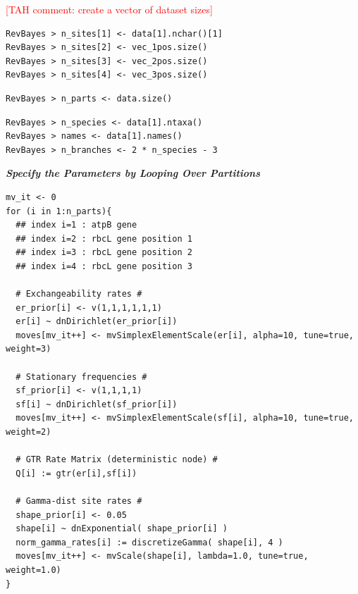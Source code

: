 \documentclass[11pt]{article}
\newcommand{\taha}[1]{{\textcolor{red}{[TAH comment: #1]}}} %
\begin{document}
\taha{create a vector of dataset sizes}
{\tt \begin{snugshade*}
\begin{lstlisting}
RevBayes > n_sites[1] <- data[1].nchar()[1]
RevBayes > n_sites[2] <- vec_1pos.size()
RevBayes > n_sites[3] <- vec_2pos.size()
RevBayes > n_sites[4] <- vec_3pos.size()
\end{lstlisting}
\end{snugshade*}}

{\tt \begin{snugshade*}
\begin{lstlisting}
RevBayes > n_parts <- data.size()
\end{lstlisting}
\end{snugshade*}}

{\tt \begin{snugshade*}
\begin{lstlisting}
RevBayes > n_species <- data[1].ntaxa()
RevBayes > names <- data[1].names()
RevBayes > n_branches <- 2 * n_species - 3
\end{lstlisting}
\end{snugshade*}}



\textbf{\textit{Specify the Parameters by Looping Over Partitions}}


{\tt \small \begin{snugshade*}
\begin{lstlisting}
mv_it <- 0
for (i in 1:n_parts){
  ## index i=1 : atpB gene
  ## index i=2 : rbcL gene position 1
  ## index i=3 : rbcL gene position 2
  ## index i=4 : rbcL gene position 3

  # Exchangeability rates #
  er_prior[i] <- v(1,1,1,1,1,1)
  er[i] ~ dnDirichlet(er_prior[i])
  moves[mv_it++] <- mvSimplexElementScale(er[i], alpha=10, tune=true, weight=3) 

  # Stationary frequencies #
  sf_prior[i] <- v(1,1,1,1)
  sf[i] ~ dnDirichlet(sf_prior[i])
  moves[mv_it++] <- mvSimplexElementScale(sf[i], alpha=10, tune=true, weight=2) 

  # GTR Rate Matrix (deterministic node) #
  Q[i] := gtr(er[i],sf[i]) 

  # Gamma-dist site rates #
  shape_prior[i] <- 0.05 
  shape[i] ~ dnExponential( shape_prior[i] )
  norm_gamma_rates[i] := discretizeGamma( shape[i], 4 )
  moves[mv_it++] <- mvScale(shape[i], lambda=1.0, tune=true, weight=1.0)
}
\end{lstlisting}
\end{snugshade*}}
\end{document}
